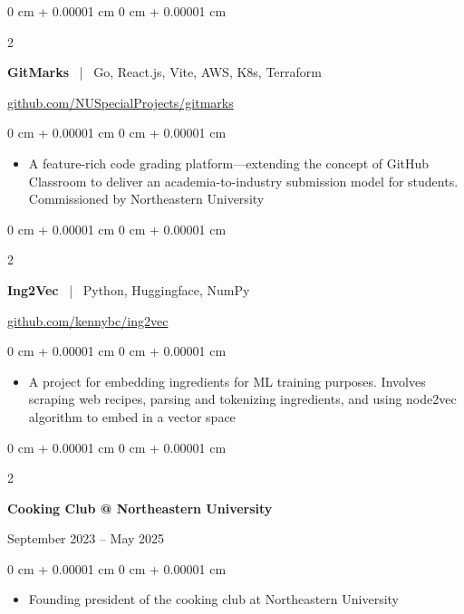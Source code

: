 \documentclass[10pt, letterpaper]{article}
\newenvironment{highlights}{
    \begin{itemize}[
        topsep=0pt,
        parsep=0pt,
        partopsep=0pt,
        itemsep=0pt,
        leftmargin=0 cm + 10pt
    ]
}{
    \end{itemize}
} %
\newenvironment{onecolentry}{
    \begin{adjustwidth}{
        0 cm + 0.00001 cm
    }{
        0 cm + 0.00001 cm
    }
}{
    \end{adjustwidth}
} %
\newenvironment{twocolentry}[2][]{
    \onecolentry
    \def\secondColumn{#2}
    \setcolumnwidth{\fill, 4.5 cm}
    \begin{paracol}{2}
}{
    \switchcolumn \raggedleft \secondColumn
    \end{paracol}
    \endonecolentry
} %
\newenvironment{repoentry}[2][]{
    \onecolentry
    \def\secondColumn{#2}
    \setcolumnwidth{\fill, \fill}
    \begin{paracol}{2}
}{
    \switchcolumn \raggedleft \secondColumn
    \end{paracol}
    \endonecolentry
} %
\begin{document}
	\vspace{0.2 cm}
	
	\begin{repoentry}{\href{https://github.com/NUSpecialProjects/gitmarks}{github.com/NUSpecialProjects/gitmarks}}
        \textbf{GitMarks} ~|~ Go, React.js, Vite, AWS, K8s, Terraform
	\end{repoentry}
    \vspace{0.10 cm}
    \begin{onecolentry}
        \begin{highlights}
            \item A feature-rich code grading platform—extending the concept of GitHub Classroom to deliver an academia-to-industry submission model for students. Commissioned by Northeastern University
        \end{highlights}
    \end{onecolentry}
    
    \vspace{0.2 cm}
    
    \begin{repoentry}{\href{https://github.com/kennybc/ing2vec}{github.com/kennybc/ing2vec}}
    	\textbf{Ing2Vec} ~|~ Python, Huggingface, NumPy
    \end{repoentry}
    \vspace{0.10 cm}
    \begin{onecolentry}
    	\begin{highlights}
    		\item A project for embedding ingredients for ML training purposes. Involves scraping web recipes, parsing and tokenizing ingredients, and using node2vec algorithm to embed in a vector space
    	\end{highlights}
    \end{onecolentry}
    
    \vspace{0.2 cm}
    
    \begin{twocolentry}{September 2023 -- May 2025}
    	\textbf{Cooking Club @ Northeastern University}
    \end{twocolentry}
    \vspace{0.10 cm}
    \begin{onecolentry}
    	\begin{highlights}
    		\item Founding president of the cooking club at Northeastern University
    	\end{highlights}
    \end{onecolentry}
\end{document}
